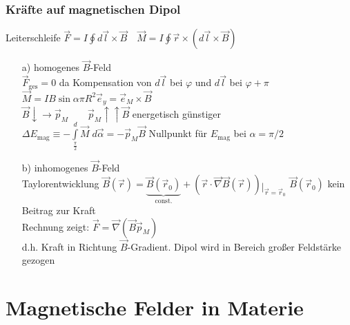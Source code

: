 \documentclass[titlepage,12pt,a4paper,ngerman]{report}
\newcommand{\tx}[1]{\textrm{#1}}
\newcommand{\ub}[1]{\underbrace{#1}}
\begin{document}
\subsubsection{Kräfte auf magnetischen Dipol}
Leiterschleife $ \vec{F} = I \oint d\vec{l} \times \vec{B} \quad \vec{M} = I \oint \vec{r} \times (d\vec{l} \times \vec{B}) $\\
\begin{itemize}
	\item[a)] homogenes $ \vec{B} $-Feld\\
	$ \vec{F}_{\tx{ges}} = 0 $ da Kompensation von $ d\vec{l} $ bei $ \varphi $ und $ d\vec{l} $ bei $ \varphi + \pi $\\
	$ \vec{M} = I B \sin \alpha \pi R^2 \vec{e}_y = \vec{e}_M \times \vec{B} $\\
	$ \vec{B} \downarrow \rightarrow \vec{p}_M \qquad \vec{p}_M \uparrow \uparrow \vec{B} $ energetisch günstiger\\
	$ \Delta E_{\tx{mag}} \equiv - \int \limits _{\frac{\pi}{2}} ^{d} \vec{M} \; d \vec{\alpha} = - \vec{p}_M \vec{B} $ Nullpunkt für $ E_{\tx{mag}}$ bei $ \alpha = \pi / 2 $
	\item[b)] inhomogenes $ \vec{B} $-Feld\\
	Taylorentwicklung $ \vec{B} (\vec{r}) = \ub{\vec{B} (\vec{r}_0 )}_{\tx{const.}} + (\vec{r} \cdot \vec{\nabla} \vec{B}( \vec{r} )) \mathop{\vert}_{\vec{r} = \vec{r}_0} $
	$ \vec{B} (\vec{r}_0) $ kein Beitrag zur Kraft\\
	Rechnung zeigt: $ \vec{F} = \vec{\nabla} ( \vec{B} \vec{p}_M) $\\
	d.h. Kraft in Richtung $ \vec{B} $-Gradient. Dipol wird in Bereich großer Feldstärke gezogen
\end{itemize}


\section{Magnetische Felder in Materie}
\end{document}

